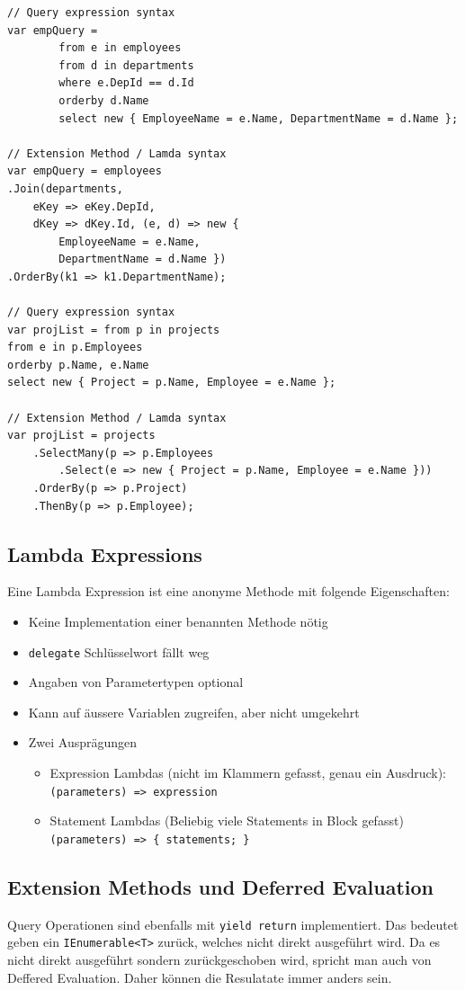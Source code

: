 \documentclass[
a4paper,
oneside,
10pt,
fleqn,
headsepline,
toc=listofnumbered, 
bibliography=totocnumbered]{scrartcl}
\begin{document}
\begin{lstlisting}
// Query expression syntax
var empQuery =
        from e in employees
        from d in departments
        where e.DepId == d.Id
        orderby d.Name
        select new { EmployeeName = e.Name, DepartmentName = d.Name };

// Extension Method / Lamda syntax
var empQuery = employees
.Join(departments, 
	eKey => eKey.DepId, 
	dKey => dKey.Id, (e, d) => new { 
		EmployeeName = e.Name, 
		DepartmentName = d.Name })
.OrderBy(k1 => k1.DepartmentName);

// Query expression syntax
var projList = from p in projects
from e in p.Employees
orderby p.Name, e.Name
select new { Project = p.Name, Employee = e.Name };

// Extension Method / Lamda syntax
var projList = projects
    .SelectMany(p => p.Employees
        .Select(e => new { Project = p.Name, Employee = e.Name }))
    .OrderBy(p => p.Project)
    .ThenBy(p => p.Employee);			  
\end{lstlisting}
\subsection{Lambda Expressions}
Eine Lambda Expression ist eine anonyme Methode mit folgende Eigenschaften:
\begin{itemize}
	\item Keine Implementation einer benannten Methode nötig
	\item \lstinline|delegate| Schlüsselwort fällt weg
	\item Angaben von Parametertypen optional
	\item Kann auf äussere Variablen zugreifen, aber nicht umgekehrt
	\item Zwei Ausprägungen
	      \begin{itemize}
		      \item Expression Lambdas (nicht im Klammern gefasst, genau ein Ausdruck): \lstinline|(parameters) => expression|
		      \item Statement Lambdas (Beliebig viele Statements in Block gefasst) \lstinline|(parameters) => { statements; }|
	      \end{itemize}
\end{itemize}

\subsection{Extension Methods und Deferred Evaluation}
Query Operationen sind ebenfalls mit \lstinline|yield return| implementiert. Das bedeutet geben ein \lstinline|IEnumerable<T>| zurück, welches nicht direkt ausgeführt wird. Da es nicht direkt ausgeführt sondern zurückgeschoben wird, spricht man auch von Deffered Evaluation. Daher können die Resulatate immer anders sein.
\end{document}
